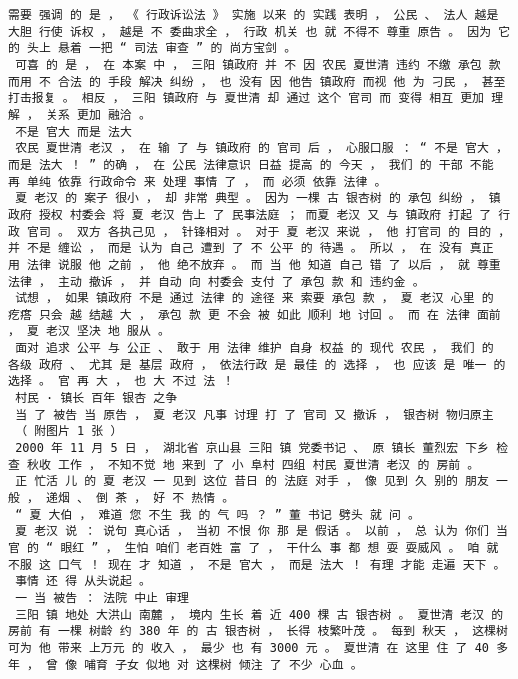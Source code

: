 \documentclass{article}
\begin{document}
\begin{Verbatim}[commandchars=\\\{\}]
 需要 强调 的 是 ， 《 行政诉讼法 》 实施 以来 的 实践 表明 ， 公民 、 法人 越是 大胆 行使 诉权 ， 越是 不 委曲求全 ， 行政 机关 也 就 不得不 尊重 原告 。 因为 它 的 头上 悬着 一把 “ 司法 审查 ” 的 尚方宝剑 。 
 可喜 的 是 ， 在 本案 中 ， 三阳 镇政府 并 不 因 农民 夏世清 违约 不缴 承包 款而用 不 合法 的 手段 解决 纠纷 ， 也 没有 因 他告 镇政府 而视 他 为 刁民 ， 甚至 打击报复 。 相反 ， 三阳 镇政府 与 夏世清 却 通过 这个 官司 而 变得 相互 更加 理解 ， 关系 更加 融洽 。 
 不是 官大 而是 法大 
 农民 夏世清 老汉 ， 在 输 了 与 镇政府 的 官司 后 ， 心服口服 ： “ 不是 官大 ， 而是 法大 ！ ” 的确 ， 在 公民 法律意识 日益 提高 的 今天 ， 我们 的 干部 不能 再 单纯 依靠 行政命令 来 处理 事情 了 ， 而 必须 依靠 法律 。 
 夏 老汉 的 案子 很小 ， 却 非常 典型 。 因为 一棵 古 银杏树 的 承包 纠纷 ， 镇政府 授权 村委会 将 夏 老汉 告上 了 民事法庭 ； 而夏 老汉 又 与 镇政府 打起 了 行政 官司 。 双方 各执己见 ， 针锋相对 。 对于 夏 老汉 来说 ， 他 打官司 的 目的 ， 并 不是 缠讼 ， 而是 认为 自己 遭到 了 不 公平 的 待遇 。 所以 ， 在 没有 真正 用 法律 说服 他 之前 ， 他 绝不放弃 。 而 当 他 知道 自己 错 了 以后 ， 就 尊重 法律 ， 主动 撤诉 ， 并 自动 向 村委会 支付 了 承包 款 和 违约金 。 
 试想 ， 如果 镇政府 不是 通过 法律 的 途径 来 索要 承包 款 ， 夏 老汉 心里 的 疙瘩 只会 越 结越 大 ， 承包 款 更 不会 被 如此 顺利 地 讨回 。 而 在 法律 面前 ， 夏 老汉 坚决 地 服从 。 
 面对 追求 公平 与 公正 、 敢于 用 法律 维护 自身 权益 的 现代 农民 ， 我们 的 各级 政府 、 尤其 是 基层 政府 ， 依法行政 是 最佳 的 选择 ， 也 应该 是 唯一 的 选择 。 官 再 大 ， 也 大 不过 法 ！ 
 村民 · 镇长 百年 银杏 之争 
 当 了 被告 当 原告 ， 夏 老汉 凡事 讨理 打 了 官司 又 撤诉 ， 银杏树 物归原主 
 （ 附图片 1 张 ） 
 2000 年 11 月 5 日 ， 湖北省 京山县 三阳 镇 党委书记 、 原 镇长 董烈宏 下乡 检查 秋收 工作 ， 不知不觉 地 来到 了 小 阜村 四组 村民 夏世清 老汉 的 房前 。 
 正 忙活 儿 的 夏 老汉 一 见到 这位 昔日 的 法庭 对手 ， 像 见到 久 别的 朋友 一般 ， 递烟 、 倒 茶 ， 好 不 热情 。 
 “ 夏 大伯 ， 难道 您 不生 我 的 气 吗 ？ ” 董 书记 劈头 就 问 。 
 夏 老汉 说 ： 说句 真心话 ， 当初 不恨 你 那 是 假话 。 以前 ， 总 认为 你们 当官 的 “ 眼红 ” ， 生怕 咱们 老百姓 富 了 ， 干什么 事 都 想 耍 耍威风 。 咱 就 不服 这 口气 ！ 现在 才 知道 ， 不是 官大 ， 而是 法大 ！ 有理 才能 走遍 天下 。 
 事情 还 得 从头说起 。 
 一 当 被告 ： 法院 中止 审理 
 三阳 镇 地处 大洪山 南麓 ， 境内 生长 着 近 400 棵 古 银杏树 。 夏世清 老汉 的 房前 有 一棵 树龄 约 380 年 的 古 银杏树 ， 长得 枝繁叶茂 。 每到 秋天 ， 这棵树 可为 他 带来 上万元 的 收入 ， 最少 也 有 3000 元 。 夏世清 在 这里 住 了 40 多年 ， 曾 像 哺育 子女 似地 对 这棵树 倾注 了 不少 心血 。 

\end{Verbatim}
\end{document}
